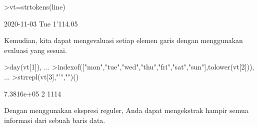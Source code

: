 \documentclass[a4paper,10pt]{article}
\begin{document}
\begin{eulernotebook}
\begin{eulercomment}
\begin{eulercomment}
\begin{eulercomment}
\begin{eulercomment}
\begin{eulercomment}
\begin{eulercomment}
\begin{eulercomment}
\begin{eulercomment}
\begin{eulercomment}
\begin{eulercomment}
\begin{eulercomment}
\begin{eulercomment}
\begin{eulercomment}
\begin{eulercomment}
\begin{eulercomment}
\begin{eulercomment}
\begin{eulercomment}
\begin{eulercomment}
\begin{eulercomment}
\begin{eulercomment}
\begin{eulercomment}
\begin{eulercomment}
\begin{eulercomment}
\begin{eulercomment}
\begin{eulercomment}
\begin{eulercomment}
\begin{eulercomment}
\begin{eulercomment}
\begin{eulercomment}
\begin{eulercomment}
\begin{eulercomment}
\begin{eulercomment}
\begin{eulercomment}
\begin{eulercomment}
\begin{eulercomment}
\begin{eulercomment}
\begin{eulercomment}
\begin{eulercomment}
\begin{eulercomment}
\begin{eulercomment}
\begin{eulercomment}
\begin{eulercomment}
\begin{eulercomment}
\begin{eulercomment}
\begin{eulercomment}
\begin{eulercomment}
\begin{eulercomment}
\begin{eulercomment}
\begin{eulercomment}
\begin{eulercomment}
\begin{eulerprompt}
>vt=strtokens(line)
\end{eulerprompt}
\begin{euleroutput}
  2020-11-03
  Tue
  1'114.05
\end{euleroutput}
\begin{eulercomment}
Kemudian, kita dapat mengevaluasi setiap elemen garis dengan
menggunakan evaluasi yang sesuai.
\end{eulercomment}
\begin{eulerprompt}
>day(vt[1]),  ...
>indexof(["mon","tue","wed","thu","fri","sat","sun"],tolower(vt[2])),  ...
>strrepl(vt[3],"'","")()
\end{eulerprompt}
\begin{euleroutput}
  7.3816e+05
  2
  1114
\end{euleroutput}
\begin{eulercomment}
Dengan menggunakan ekspresi reguler, Anda dapat mengekstrak hampir
semua informasi dari sebuah baris data.


\end{eulercomment}
\end{eulercomment}
\end{eulercomment}
\end{eulercomment}
\end{eulercomment}
\end{eulercomment}
\end{eulercomment}
\end{eulercomment}
\end{eulercomment}
\end{eulercomment}
\end{eulercomment}
\end{eulercomment}
\end{eulercomment}
\end{eulercomment}
\end{eulercomment}
\end{eulercomment}
\end{eulercomment}
\end{eulercomment}
\end{eulercomment}
\end{eulercomment}
\end{eulercomment}
\end{eulercomment}
\end{eulercomment}
\end{eulercomment}
\end{eulercomment}
\end{eulercomment}
\end{eulercomment}
\end{eulercomment}
\end{eulercomment}
\end{eulercomment}
\end{eulercomment}
\end{eulercomment}
\end{eulercomment}
\end{eulercomment}
\end{eulercomment}
\end{eulercomment}
\end{eulercomment}
\end{eulercomment}
\end{eulercomment}
\end{eulercomment}
\end{eulercomment}
\end{eulercomment}
\end{eulercomment}
\end{eulercomment}
\end{eulercomment}
\end{eulercomment}
\end{eulercomment}
\end{eulercomment}
\end{eulercomment}
\end{eulercomment}
\end{eulercomment}
\end{eulernotebook}
\end{document}
